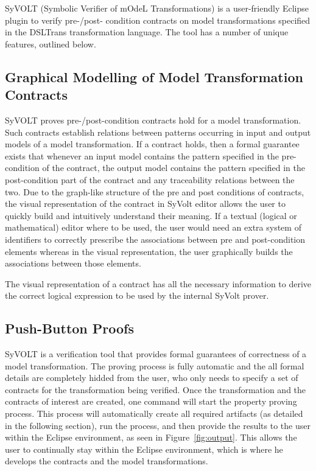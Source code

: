 SyVOLT (Symbolic Verifier of mOdeL Transformations) is a user-friendly
Eclipse plugin to verify pre-/post- condition contracts on model transformations
specified in the DSLTrans transformation language. The tool has a number of
unique features, outlined below.

\subsection{Graphical Modelling of Model Transformation Contracts}

SyVOLT proves pre-/post-condition contracts hold for a model transformation.
Such contracts establish relations between patterns occurring in input and output
models of a model transformation. If a contract holds, then a formal guarantee
exists that whenever an input model contains the pattern specified in the
pre-condition of the contract, the output model contains the pattern specified
in the post-condition part of the contract and any traceability relations
between the two. Due to the graph-like structure of the pre and post conditions
of contracts, the visual representation of the contract in SyVolt editor allows
the user to quickly build and intuitively understand their meaning.
If a textual (logical or mathematical) editor where to be used, the user would
need an extra system of identifiers to correctly prescribe the associations between pre and post-condition elements whereas in the visual representation, the user graphically builds the associations between those elements.

The visual representation of a contract has all the necessary information to derive the correct 
logical expression to be used by the internal SyVolt prover.

\subsection{Push-Button Proofs}
\label{sec:push_button_proofs}
SyVOLT is a verification tool that provides formal guarantees of correctness of
a model transformation. The proving process is fully automatic and
the all formal details are completely hidded from the user, who only needs to specify a
set of contracts for the transformation being verified. Once the transformation and the
contracts of interest are created, one command will start the property proving
process. This process will automatically create all required artifacts (as
detailed in the following section), run the process, and then provide the
results to the user within the Eclipse environment, as seen in
Figure~\ref{fig:output}. This allows the user to continually stay within the
Eclipse environment, which is where he develops the contracts and the model
transformations.

